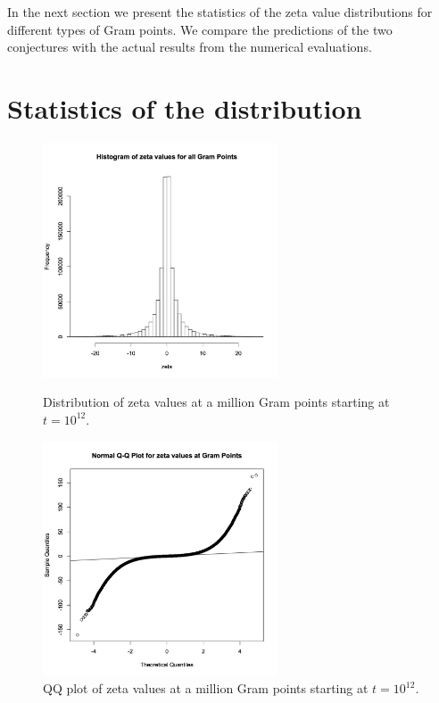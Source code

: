 \documentclass[twoside]{article}
\begin{document}
In the next section we present the statistics of the zeta value distributions for different types of Gram points. We compare the predictions of the two conjectures with the actual results from the numerical evaluations.

\section{\label{sec4}Statistics of the distribution}


\begin{figure}
\centering
\includegraphics[width=0.62\textwidth]{rzeta.jpg}
\caption[]{ 
 Distribution of zeta values at a million Gram points starting at $t = 10^{12}$.
  }
\vspace{1mm}
\label{allhist}

\includegraphics[width=0.62\textwidth]{qqr.jpg}
\caption[]{ 
 QQ plot of zeta values at a million Gram points starting at $t = 10^{12}$.
  }
\vspace{1mm}
\label{qqr}
\end{figure}
\end{document}
